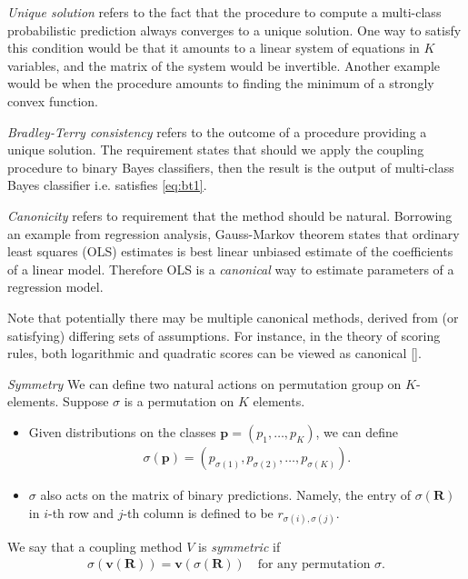 \emph{Unique solution} refers to the fact that the procedure to compute a multi-class probabilistic prediction always converges to a unique solution. One way to satisfy this condition would be that it amounts to a linear system of equations in $K$ variables, and the matrix of the system would be invertible. Another example would be when the procedure amounts to finding the minimum of a strongly convex function. 

\emph{Bradley-Terry consistency} refers to the outcome of a procedure providing a unique solution. The requirement states that should we apply the coupling procedure to binary Bayes classifiers, then the result is the output of multi-class Bayes classifier i.e. satisfies \eqref{eq:bt1}.

\emph{Canonicity} refers to requirement that the method should be natural. Borrowing an example from regression analysis, Gauss-Markov theorem states that ordinary least squares (OLS) estimates is best linear unbiased estimate of the coefficients of a linear model. Therefore OLS  is a \emph{canonical} way to estimate parameters of a regression model. 

Note that potentially there may be multiple canonical methods, derived from (or satisfying) differing sets of assumptions. For instance, in the theory of scoring rules, both logarithmic and quadratic scores can be viewed as canonical [\cite{shannon1948mathematical,selten1998axiomatic}].

\emph{Symmetry} We can define two natural actions on permutation group on $K$-elements. Suppose $\sigma$ is a permutation on $K$ elements. 

\begin{itemize}
	\item Given  distributions on the classes $\boldsymbol{p}= (p_1, \ldots, p_K)$, we can define
	\begin{align}
		\sigma(\boldsymbol{p})= (p_{\sigma(1)},p_{\sigma(2)}, \ldots, p_{\sigma(K)}).
	\end{align}
	 \item $\sigma$ also acts on the matrix of binary predictions. Namely, the entry of $\sigma(\boldsymbol{R})$ in $i$-th row and $j$-th column is defined to be $r_{\sigma(i), \sigma(j)}$.
	 \end{itemize}
We say that a coupling method $V$ is \emph{symmetric} if 
\begin{align}
		\sigma(\boldsymbol{v}(\boldsymbol{R})) = \boldsymbol{v}(\sigma(\boldsymbol{R}))\quad\textrm{for any permutation $\sigma$}.
\end{align}

